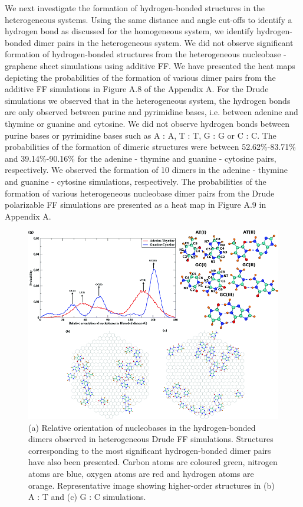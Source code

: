     We next investigate the formation of hydrogen-bonded structures in the heterogeneous systems. Using the same distance and angle cut-offs to identify a hydrogen bond as discussed for the homogeneous system, we identify hydrogen-bonded dimer pairs in the heterogeneous system. We did not observe significant formation of hydrogen-bonded structures from the heterogeneous nucleobase - graphene sheet simulations using additive FF. We have presented the heat maps depicting the probabilities of the formation of various dimer pairs from the additive FF simulations in Figure A.8 of the Appendix A. For the Drude simulations we observed that in the heterogeneous system, the hydrogen bonds are only observed between purine and pyrimidine bases, i.e. between adenine and thymine or guanine and cytosine. We did not observe hydrogen bonds between purine bases or pyrimidine bases such as A : A, T : T, G : G or C : C. The probabilities of the formation of dimeric structures were between 52.62\%-83.71\% and 39.14\%-90.16\% for the adenine - thymine and guanine - cytosine pairs, respectively. We observed the formation of 10 dimers in the adenine - thymine and guanine - cytosine simulations, respectively. The probabilities of the formation of various heterogeneous nucleobase dimer pairs from the Drude polarizable FF simulations are presented as a heat map in Figure A.9 in Appendix A.
    \begin{figure}
        \centering
        \includegraphics[width=\textwidth]{Chapter1/Figures/Figurelast.png}
        \caption[Relative orientation of nucleobases in the hydrogen-bonded dimers observed in heterogeneous Drude FF simulations. Structures corresponding to the most significant hydrogen-bonded dimer pairs have also been presented]{(a) Relative orientation of nucleobases in the hydrogen-bonded dimers observed in heterogeneous Drude FF simulations. Structures corresponding to the most significant hydrogen-bonded dimer pairs have also been presented. Carbon atoms are coloured green, nitrogen atoms are blue, oxygen atoms are red and hydrogen atoms are orange. Representative image showing higher-order structures in (b) A : T and (c) G : C simulations.}
    \end{figure}


